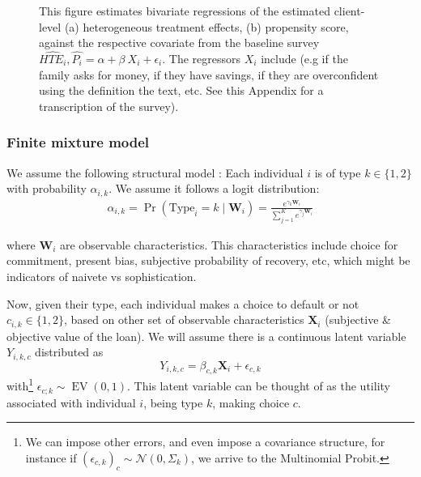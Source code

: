 \documentclass[oneside,11pt]{article}
\begin{document}
\begin{figure}[H]
\begin{center}
    \end{center}
     \scriptsize   This figure estimates bivariate regressions of the estimated client-level (a) heterogeneous treatment effects, (b) propensity score, against the respective covariate from the baseline survey  $\widehat{HTE_i}, \widehat{P_i} = \alpha + \beta \: X_i + \epsilon_i$. The regressors $X_i$ include (e.g if the family asks for money, if they have savings, if they are overconfident using the definition the text, etc. See this Appendix for a transcription of the survey). \\
\end{figure}



\subsubsection{Finite mixture model }\label{fmm_section}

\vspace{.2in}
\normalsize
\linespread{1.25}

We assume the following structural model : Each individual $i$ is of type  $k\in\{1, 2\}$ with probability $\alpha_{i,k}$. We assume it follows a logit distribution:
\begin{align*}
\label{dist_alpha}
    \alpha_{i,k} = \Pr(\text{Type}_i = k \;|\; \mathbf{W}_{i}) = \frac{e^{\gamma_{k}\mathbf{W}_i}}{\sum_{j=1}^{K} e^{\gamma_{j}\mathbf{W}_i}}
\end{align*}

where $\mathbf{W}_i$ are observable characteristics. This characteristics include choice for commitment, present bias, subjective probability of recovery, etc, which might be indicators of naivete vs sophistication.  

Now, given their type, each individual makes a choice to default or not $c_{i,k} \in \{1,2\}$, based on other set of observable characteristics $\mathbf{X}_i$ (subjective \& objective value of the loan). We will assume there is a continuous latent variable $Y_{i,k,c}$ distributed as
\[Y_{i,k,c} = \beta_{c,k}\mathbf{X}_{i} +\epsilon_{c,k}\]
with\footnote{We can impose other errors, and even impose a covariance structure, for instance if $(\epsilon_{c,k})_{c}\sim\mathcal{N}(0,\Sigma_k)$, we arrive to the Multinomial Probit.} $\epsilon_{c;k}\sim\operatorname{EV}(0,1)$. This latent variable can be thought of as the utility associated with individual $i$, being type $k$, making choice $c$. 
\end{document}
